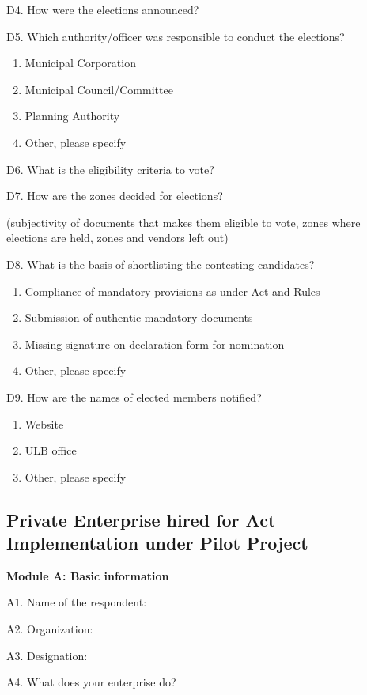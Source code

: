 \documentclass[a4paper, 12pt, twoside]{article}
\begin{document}
{{\begin{mdframed}[backgroundcolor=gray!20]
D4. How were the elections announced?

D5. Which authority/officer was responsible to conduct the elections?
\begin{enumerate}[nosep]
\item Municipal Corporation
\item Municipal Council/Committee
\item Planning Authority
\item Other, please specify
\end{enumerate}

D6. What is the eligibility criteria to vote?

D7. How are the zones decided for elections?

       (subjectivity of documents that makes them eligible to vote, zones where elections are held,
       zones and vendors left out)

D8. What is the basis of shortlisting the contesting candidates?
\begin{enumerate}[nosep]
\item Compliance of mandatory provisions as under Act and Rules
\item Submission of authentic mandatory documents
\item Missing signature on declaration form for nomination
\item Other, please specify
\end{enumerate}

D9. How are the names of elected members notified?
\begin{enumerate}[nosep]
\item Website
\item ULB office
\item Other, please specify
\end{enumerate}
\end{mdframed}

\begin{mdframed}[backgroundcolor=gray!20]
\subsection*{Private Enterprise hired for Act Implementation under Pilot Project}

\textbf{Module A: Basic information}

A1. Name of the respondent:

A2. Organization:

A3. Designation:

A4. What does your enterprise do?


\end{mdframed}}}
\end{document}
